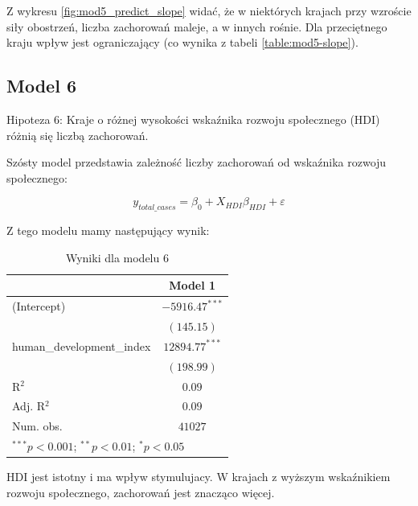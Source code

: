 \documentclass[12pt]{mwbk}
\theoremstyle{plain}
\theoremstyle{definition}
\theoremstyle{remark}
\begin{document}
Z wykresu \ref{fig:mod5_predict_slope} widać, że w niektórych krajach przy wzroście siły obostrzeń, liczba zachorowań maleje, a w innych rośnie. Dla przeciętnego kraju wpływ jest ograniczający (co wynika z tabeli \ref{table:mod5-slope}).

\newpage

\subsection{Model 6}

Hipoteza 6: Kraje o różnej wysokości wskaźnika rozwoju społecznego (HDI) różnią się liczbą zachorowań.

Szósty model przedstawia zależność liczby zachorowań od wskaźnika rozwoju społecznego:

$$y_{total\_cases}=\beta_0+X_{HDI}\beta_{HDI}+\varepsilon$$

Z tego modelu mamy następujący wynik:

\begin{table}[!htbp]
	\begin{center}
		\begin{tabular}{l c}
			\hline
			& Model 1 \\
			\hline
			(Intercept)               & $-5916.47^{***}$ \\
			& $(145.15)$       \\
			human\_development\_index & $12894.77^{***}$ \\
			& $(198.99)$       \\
			\hline
			R$^2$                     & $0.09$           \\
			Adj. R$^2$                & $0.09$           \\
			Num. obs.                 & $41027$          \\
			\hline
			\multicolumn{2}{l}{\scriptsize{$^{***}p<0.001$; $^{**}p<0.01$; $^{*}p<0.05$}}
		\end{tabular}
		\caption{Wyniki dla modelu 6}
		\label{table:mod6}
	\end{center}
\end{table}

HDI jest istotny i ma wpływ stymulujacy. W krajach z wyższym wskaźnikiem rozwoju społecznego, zachorowań jest znacząco więcej.
\end{document}
